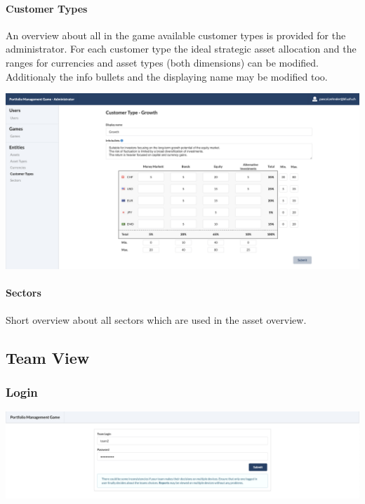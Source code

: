 \paragraph{Customer Types}
An overview about all in the game available customer types is provided for the administrator. For each customer type the ideal strategic asset allocation and the ranges for currencies and asset types (both dimensions) can be modified. Additionaly the info bullets and the displaying name may be modified too.
\begin{center}
  \includegraphics[scale=0.2]{img/application-overview/administrator/entities_customer_types.png}
\end{center}

\paragraph{Sectors}
Short overview about all sectors which are used in the asset overview.





\subsection{Team View}

\subsubsection{Login}
\begin{center}
  \includegraphics[scale=0.2]{img/application-overview/teams/01_login.png}
\end{center}


